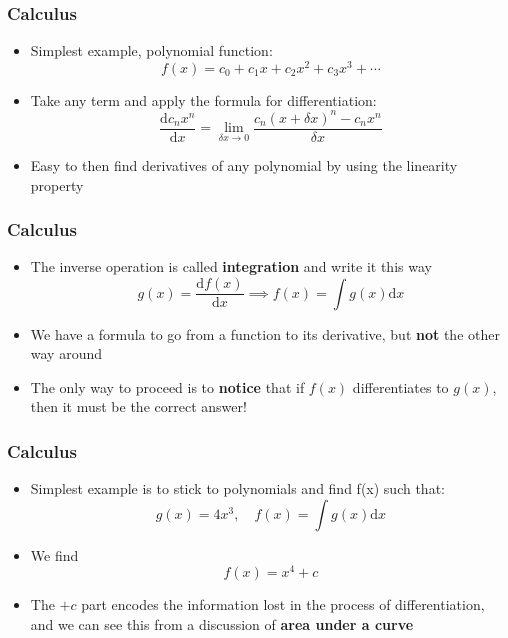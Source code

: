 \documentclass{beamer}
\begin{document}
\begin{frame}
  \frametitle{Calculus}
  \begin{itemize}
    \item<1-> Simplest example, polynomial function:
      \begin{equation*}
	f(x)=c_0+c_1x+c_2x^2+c_3x^3+\cdots
	\label{<+label+>}
      \end{equation*}
    \item<2-> Take any term and apply the formula for differentiation:
      \begin{equation*}
	\frac{\mathrm{d}c_nx^n}{\mathrm{d}x}=\lim_{\delta x\to 0}\frac{c_n(x+\delta x)^n-c_nx^n}{\delta x}
      \end{equation*}
    \item<3-> Easy to then find derivatives of any polynomial by using the linearity property
  \end{itemize}
\end{frame}

\begin{frame}
  \frametitle{Calculus}
  \begin{itemize}
    \item<1-> The inverse operation is called \textbf{integration} and write it this way
      \begin{equation*}
	g(x)=\frac{\mathrm{d}f(x)}{\mathrm{d}x}\implies f(x)=\int g(x)\mathrm{d}x
	\label{<+label+>}
      \end{equation*}
    \item<2-> We have a formula to go from a function to its derivative, but \textbf{not} the other way around
    \item<3-> The only way to proceed is to \textbf{notice} that if $f(x)$ differentiates to $g(x)$, then it must be the correct answer!
  \end{itemize}
\end{frame}

\begin{frame}
  \frametitle{Calculus}
  \begin{itemize}
    \item<1-> Simplest example is to stick to polynomials and find f(x) such that:
      \begin{equation*}
	g(x)=4x^3, \quad f(x)=\int g(x)\mathrm{d}x
	\label{<+label+>}
      \end{equation*}
    \item<2-> We find
\begin{equation}
  f(x)=x^4+c
  \label{<+label+>}
\end{equation}
    \item<3-> The $+c$ part encodes the information lost in the process of differentiation, and we can see this from a discussion of \textbf{area under a curve}
  \end{itemize}
\end{frame}
\end{document}
